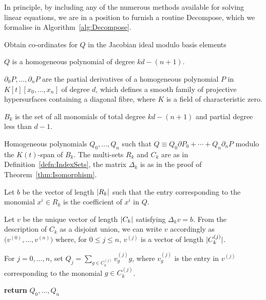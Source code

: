 In principle, by including any of the numerous methods available for solving 
linear equations, we are in a position to furnish a routine {\sc Decompose}, 
which we formalise in Algorithm~\ref{alg:Decompose}.

\begin{algorithm}[ht]
\caption{Obtain co-ordinates for $Q$ in the Jacobian ideal modulo basis elements}
\label{alg:Decompose}
\begin{algorithmic}
\Require \begin{compactitem}
         \item $Q$ is a homogeneous polynomial of degree $kd - (n+1)$.
         \item $\partial_0 P, \dotsc, \partial_n P$ are the partial 
               derivatives of a homogeneous polynomial $P$ in 
               $K[t][x_0, \dotsc, x_n]$ of degree $d$, which defines a smooth 
               family of projective hypersurfaces containing a diagonal fibre, 
               where $K$ is a field of characteristic zero.
         \item $B_k$ is the set of all monomials of total degree $kd-(n+1)$ 
               and partial degree less than $d-1$.
         \end{compactitem}
\Ensure  Homogeneous polynomials $Q_0, \dotsc, Q_n$ such that 
         $Q \equiv Q_0 \partial P_0 + \dotsb + Q_n \partial_n P$ modulo the 
         $K(t)$-span of $B_k$.
\State  The multi-sets $R_k$ and $C_k$ are as in 
        Definition~\ref{defn:IndexSets}, the matrix $\Delta_k$ is as in 
        the proof of Theorem~\ref{thm:Isomorphism}.
\State \begin{compactenum}[\it {Step} I.] \vspace{-1.24em}
\item Let $b$ be the vector of length $\left\lvert R_k\right\rvert$ such that the entry 
      corresponding to the monomial $x^i \in R_k$ is the coefficient of 
      $x^i$ in $Q$.
\item Let $v$ be the unique vector of length $\left\lvert C_k\right\rvert$ satisfying 
      $\Delta_k v = b$.  From the description of $C_k$ as a disjoint union, 
      we can write $v$ accordingly as $\bigl(v^{(0)}, \dotsc, v^{(n)}\bigr)$ 
      where, for $0 \leq j \leq n$, $v^{(j)}$ is a vector of length 
      $\lvert C_k^{(j)}\rvert$.
\item For $j = 0, \dotsc, n$, set $Q_j = \sum_{g \in C_k^{(j)}} v_g^{(j)} g$,
      where $v_g^{(j)}$ is the entry in $v^{(j)}$ corresponding to the 
      monomial $g \in C_k^{(j)}$.
\item \textbf{return} $Q_0, \dotsc, Q_n$
\end{compactenum}
\EndProcedure
\end{algorithmic}
\end{algorithm}

